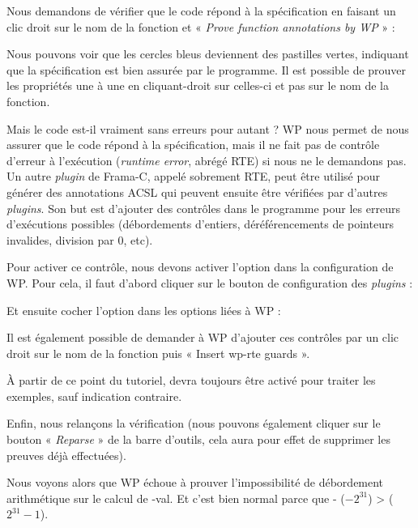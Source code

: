 Nous demandons de vérifier que le code répond à la spécification en faisant
un clic droit sur le nom de la fonction et « \textit{Prove function annotations by WP} » :





Nous pouvons voir que les cercles bleus deviennent des pastilles vertes,
indiquant que la spécification est bien assurée par le programme. Il est
possible de prouver les propriétés une à une en cliquant-droit sur celles-ci
et pas sur le nom de la fonction.



Mais le code est-il vraiment sans erreurs pour autant ? WP nous permet de nous
assurer que le code répond à la spécification, mais il ne fait pas de contrôle
d'erreur à l'exécution (\textit{runtime error}, abrégé RTE) si nous ne le demandons
pas. Un autre \textit{plugin} de Frama-C, appelé sobrement RTE, peut être
utilisé pour générer des annotations ACSL qui peuvent ensuite être vérifiées par
d'autres \textit{plugins}.
Son but est
d'ajouter des contrôles dans le programme pour les erreurs d'exécutions
possibles (débordements d'entiers, déréférencements de pointeurs invalides,
division par 0, etc).



Pour activer ce contrôle, nous devons activer l'option dans la configuration
de WP. Pour cela, il faut d'abord cliquer sur le bouton de configuration des
\textit{plugins} :




Et ensuite cocher l'option  dans les options liées à WP :




Il est également possible de demander à WP d'ajouter ces
contrôles par un clic droit sur le nom de la fonction puis
« Insert wp-rte guards ».


\begin{Information}
  À partir de ce point du tutoriel,  devra toujours être
  activé pour traiter les exemples, sauf indication contraire.
\end{Information}


Enfin, nous relançons la vérification (nous pouvons également cliquer sur le
bouton « \textit{Reparse} » de la barre d'outils, cela aura pour effet de supprimer les
preuves déjà effectuées).



Nous voyons alors que WP échoue à prouver  l'impossibilité de
débordement arithmétique sur le calcul de -val. Et c'est bien normal parce
que - ($-2^{31}$) >  ($2^{31}-1$).



